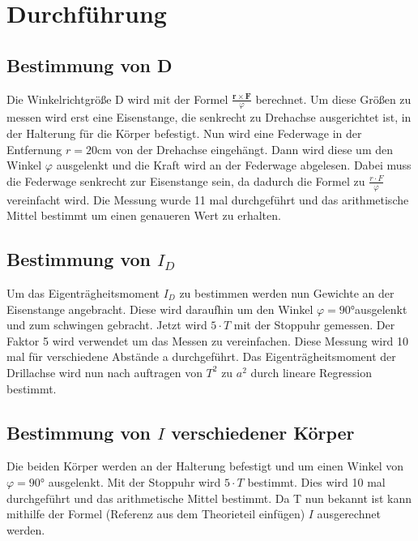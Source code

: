 \section{Durchführung}
\label{sec:Durchführung}
    \subsection{Bestimmung von D}
    Die Winkelrichtgröße D wird mit der Formel $\frac{\symbf{r}\times \symbf{F}}{\varphi}$ berechnet.
    Um diese Größen zu messen wird erst eine Eisenstange, die senkrecht zu Drehachse ausgerichtet ist, in der Halterung für die Körper befestigt.
    Nun wird eine Federwage in der Entfernung $r = 20$\unit{\centi\meter} von der Drehachse eingehängt.
    Dann wird diese um den Winkel $\varphi$ ausgelenkt und die Kraft wird an der Federwage abgelesen.
    Dabei muss die Federwage senkrecht zur Eisenstange sein, da dadurch die Formel zu $\frac{r \cdot F}{\varphi}$ vereinfacht wird.
    Die Messung wurde 11 mal durchgeführt und das arithmetische Mittel bestimmt um einen genaueren Wert zu erhalten.

    \subsection{Bestimmung von $I_D$}
    Um das Eigenträgheitsmoment $I_D$ zu bestimmen werden nun Gewichte an der Eisenstange angebracht. 
    Diese wird daraufhin um den Winkel $\varphi = 90$\unit{\degree}ausgelenkt und zum schwingen gebracht.
    Jetzt wird $5 \cdot T$ mit der Stoppuhr gemessen. 
    Der Faktor 5 wird verwendet um das Messen zu vereinfachen. 
    Diese Messung wird 10 mal für verschiedene Abstände a durchgeführt.
    Das Eigenträgheitsmoment der Drillachse wird nun nach auftragen von $T^2$ zu $a^2$ durch lineare Regression bestimmt.%

    \subsection{Bestimmung von $I$ verschiedener Körper}
    Die beiden Körper werden an der Halterung befestigt und um einen Winkel von $\varphi= 90$\unit{\degree} ausgelenkt.
    Mit der Stoppuhr wird $5 \cdot T$ bestimmt. 
    Dies wird 10 mal durchgeführt und das arithmetische Mittel bestimmt.
    Da T nun bekannt ist kann mithilfe der Formel (Referenz aus dem Theorieteil einfügen) ${I}$ ausgerechnet werden.

